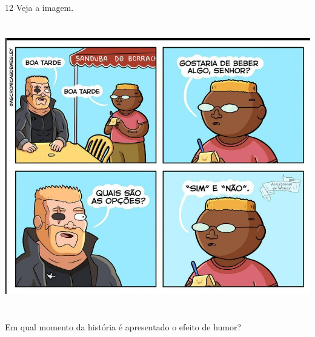 
\num{12} Veja a imagem.

\centering\includegraphics[width=5.90556in,height=4.96042in]{./imgSAEB_6_POR/media/image42.png}

\noindent Em qual momento da história é apresentado o efeito de humor?

